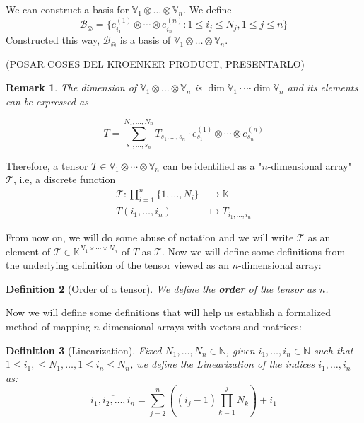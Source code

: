 \documentclass[11pt,a4paper,openright,oneside]{book}
\numberwithin{equation}{section}
\newtheorem{defn0}{Definition}[chapter]
\newtheorem{remark0}[defn0]{Remark}
\newenvironment{definition}{ \begin{defn0}}{\end{defn0}}
\newenvironment{remark}{ \begin{remark0}\rm}{\end{remark0}}
\begin{document}
We can construct a basis for $\mathbb{V}_1 \otimes \dots \otimes \mathbb{V}_n$. We define
$$\mathcal{B}_{\otimes} = \{e_{i_1}^{(1)} \otimes \cdots \otimes e_{i_n}^{(n)} : 1 \leqslant i_j \leqslant N_j, 1 \leqslant j \leqslant n\}$$
Constructed this way, $\mathcal{B}_\otimes$ is a basis of $\mathbb{V}_1 \otimes \dots \otimes \mathbb{V}_n$. 

(POSAR COSES DEL KROENKER PRODUCT, PRESENTARLO)

\begin{remark} The dimension
of ${\mathbb{V}_1 \otimes \dots \otimes \mathbb{V}_n}$ is ${\dim{\mathbb{V}_1} \cdot \cdots \dim{\mathbb{V}_n}}$ and its elements can be expressed as

$$T = \sum_{s_1, \dots, s_n}^{N_1, \dots, N_n} T_{s_1, \dots, s_n} \cdot  e_{s_1}^{(1)} \otimes \cdots \otimes e_{s_n}^{(n)} $$
\end{remark}

Therefore, a tensor $T \in \mathbb{V}_1 \otimes \cdots \otimes \mathbb{V}_n$ can be identified as a "$n$-dimensional array" $\mathcal{T}$, i.e,
a discrete function
$$\begin{align}
    \mathcal{T}: \prod_{i=1}^n \{1, \dots, N_i\} & \longrightarrow \mathbb{K} \\
    T(i_1, \dots, i_n) & \longmapsto T_{i_1, \dots, i_n}
\end{align}$$

From now on, we will do some abuse of notation and we will write $\mathcal{T}$ as
an element of ${\mathcal{T} \in \mathbb{K}^{N_1 \times \cdots \times N_n}}$ \cite{yokotaVeryBasicsTensors2024}
of $T$ as $\mathcal{T}$. Now we will define some definitions from the underlying definition of the tensor viewed as an $n$-dimensional array:

\begin{definition}[Order of a tensor] We define the \textbf{order} of the tensor as $n$.
\end{definition}

Now we will define some definitions that will help us establish a formalized method of mapping $n$-dimensional arrays with
vectors and matrices:

\begin{definition}[Linearization]
    Fixed $N_1, \dots, N_n \in \mathbb{N}$, given $i_1, \dots, i_n \in \mathbb{N}$ such that $1 \leqslant i_1, \leqslant N_1, \dots, 1 \leqslant i_n \leqslant N_n$,
    we define the Linearization of the indices $i_1, \dots, i_n$ as:
    $$\overline {i_1, i_2, \dots, i_n} = \sum_{j=2}^{n} \left( (i_j - 1) \prod_{k=1}^j N_k \right) + i_1$$
\end{definition}
\end{document}
